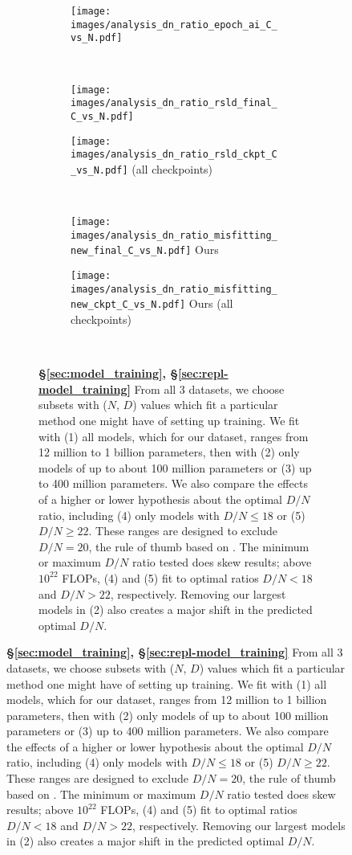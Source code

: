 \begin{figure}[]
\ContinuedFloat
\centering 
\begin{subfigure}{\textwidth}
    \centering
\begin{subfigure}{0.49\textwidth}
    \centering
    \texttt{[image: images/analysis\_dn\_ratio\_epoch\_ai\_C\_vs\_N.pdf]}
\footnotesize{\citet{hoffmann2022training,besiroglu2024chinchilla}}
\end{subfigure}
\\ \vspace{1em}
\begin{subfigure}{0.49\textwidth}
    \centering
    \texttt{[image: images/analysis\_dn\_ratio\_rsld\_final\_C\_vs\_N.pdf]}
    \footnotesize{\citet{porian2024resolving}}
\end{subfigure}
\hfill
\begin{subfigure}{0.49\textwidth}
    \centering
    \texttt{[image: images/analysis\_dn\_ratio\_rsld\_ckpt\_C\_vs\_N.pdf]}
    \footnotesize{\citet{porian2024resolving} (all checkpoints)}
\end{subfigure}
\\ \vspace{1em}
    \centering
\begin{subfigure}{0.49\textwidth}
    \centering
    \texttt{[image: images/analysis\_dn\_ratio\_misfitting\_new\_final\_C\_vs\_N.pdf]}
    \footnotesize{Ours}
\end{subfigure}
\hfill 
\begin{subfigure}{0.49\textwidth}
    \centering
    \texttt{[image: images/analysis\_dn\_ratio\_misfitting\_new\_ckpt\_C\_vs\_N.pdf]}
    \footnotesize{Ours (all checkpoints)}
\end{subfigure}
\\ \vspace{1em}
\caption{\textbf{\S\ref{sec:model_training}, \S\ref{sec:repl-model_training}} From all 3 datasets, we choose subsets with ($N$, $D$) values which fit a particular method one might have of setting up training. We fit with (1) all models, which for our dataset, ranges from 12 million to 1 billion parameters, then with (2) only models of up to about 100 million parameters or (3) up to 400 million parameters. We also compare the effects of a higher or lower hypothesis about the optimal $D/N$ ratio, including (4) only models with $D/N \leq 18$ or (5) $D/N \geq 22$. These ranges are designed to exclude $D/N = 20$, the rule of thumb based on \citet{hoffmann2022training}. The minimum or maximum $D/N$ ratio tested does skew results; above $10^{22}$ FLOPs, (4) and (5) fit to optimal ratios $D/N < 18$ and $D/N > 22$, respectively. Removing our largest models in (2) also creates a major shift in the predicted optimal $D/N$.}
    \label{fig:analysis_nd_app}
\end{subfigure}
\end{figure}

